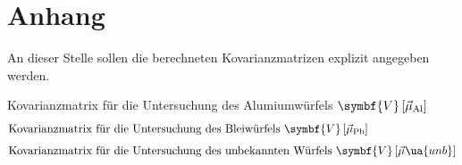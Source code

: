 \section*{Anhang}
An dieser Stelle sollen die berechneten Kovarianzmatrizen explizit angegeben werden.

Kovarianzmatrix für die Untersuchung des Alumiumwürfels $\symbf{V}\left[\vec{\mu}_{\ce{Al}}\right]$
\begin{align*}
  
\intertext{Kovarianzmatrix für die Untersuchung des Bleiwürfels $\symbf{V}\left[\vec{\mu}_{\ce{Pb}}\right]$}
  
\intertext{Kovarianzmatrix für die Untersuchung des unbekannten Würfels $\symbf{V}\left[\vec{\mu}\ua{unb}\right]$}
  
\end{align*}
